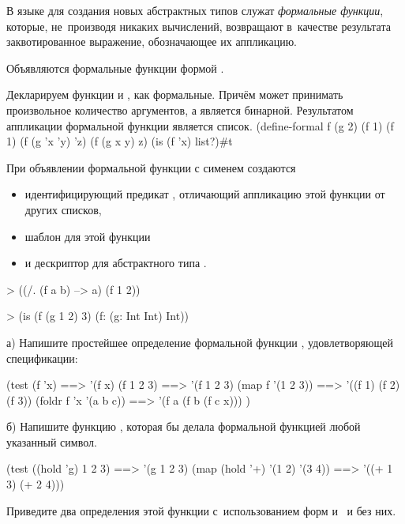 В языке \Scheme для создания новых абстрактных типов служат \emph{формальные функции}, которые, не~производя никаких вычислений, возвращают в~качестве результата заквотированное выражение, обозначающее их аппликацию.

Объявляются формальные функции формой .

\begin{example}{%
Декларируем функции  и , как формальные. Причём  может принимать произвольное количество аргументов, а  является бинарной. Результатом аппликации формальной функции является список.}
\REPLin
  {(define-formal f (g 2)}
\REPL
  {(f 1)}
  {(f 1)}
\REPL
  {(f (g 'x 'y) 'z)}
  {(f (g x y) z)}
\REPL
  {(is (f 'x) list?)}{#t}
\end{example}

\begin{example}{%
При объявлении формальной функции с сименем  создаются
\begin{itemize}
\item идентифицирующий предикат , отличающий аппликацию этой функции от других списков, 
\item шаблон для этой функции  
\item и дескриптор для абстрактного типа .
\end{itemize}}
\smallskip
\begin{ExampleCode}
> ((/. (f a b) --> a) 
   (f 1 2))
\end{ExampleCode}
\smallskip
\begin{ExampleCode}
> (is (f (g 1 2) 3)
      (f: (g: Int Int) Int))
\end{ExampleCode}
\end{example}

\begin{Assignment}
а) Напишите простейшее определение формальной функции , удовлетворяющей спецификации:
\begin{Specification}
(test 
  (f 'x)                ==> '(f x)
  (f 1 2 3)             ==> '(f 1 2 3)
  (map f '(1 2 3))      ==> '((f 1) (f 2) (f 3))
  (foldr f 'x '(a b c)) ==> '(f a (f b (f c x))) )
\end{Specification}

б) Напишите функцию , которая бы делала формальной функцией любой указанный символ. 
\begin{Specification}
(test 
 ((hold 'g) 1 2 3)             ==> '(g 1 2 3)
 (map (hold '+) '(1 2) '(3 4)) ==> '((+ 1 3) (+ 2 4)))
\end{Specification}

Приведите два определения этой функции с~использованием форм  и~ и без них.
\end{Assignment}

